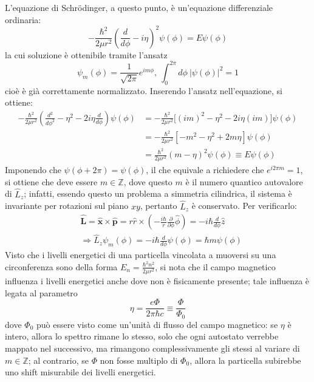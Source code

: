 \documentclass[11pt, a4paper]{scrartcl} %
\numberwithin{equation}{subsection}
\theoremstyle{style2}
\theoremstyle{style1}
\begin{document}
L'equazione di Schr\"odinger, a questo punto, \`e un'equazione differenziale ordinaria:
\begin{equation}
	- \frac{\hbar ^2}{2\mu  r^2} \left(\frac{d }{d \phi } - i \eta\right) ^2 \psi (\phi ) = E \psi (\phi )
\end{equation}
la cui soluzione \`e ottenibile tramite l'ansatz 
\[
\psi _m (\phi ) = \frac{1}{\sqrt{2\pi} }e^{i m \phi } ,\ \int_{0} ^{2\pi} d\phi \ \lvert \psi (\phi ) \rvert ^2 = 1
\] 
cio\`e \`e gi\`a correttamente normalizzato. 
Inserendo l'ansatz nell'equazione, si ottiene:
\[
\begin{split}
	- \frac{\hbar ^2}{2\mu  r^2}\left(\frac{d ^2}{d \phi ^2} - \eta^2 - 2 i \eta  \frac{d }{d \phi } \right)  \psi (\phi ) & = - \frac{\hbar ^2}{2\mu  r^2} \big[(im)^2 - \eta^2 - 2i \eta (im)\big] \psi (\phi )\\
															       & = - \frac{\hbar ^2}{2\mu r^2}[-m^2 - \eta^2 + 2m \eta] \psi (\phi) \\
															       &= \frac{\hbar ^2}{2\mu r^2}(m-\eta)^2 \psi (\phi ) \equiv E \psi (\phi )
\end{split}
\] 
Imponendo che $\psi (\phi  + 2\pi) = \psi (\phi )$, il che equivale a richiedere che $e^{i 2\pi m } = 1 $, si ottiene che deve essere $m \in \mathbb{Z}$, dove questo $m$ \`e il numero quantico autovalore di $\hat{L}_z$; infatti, essendo questo un problema a simmetria cilindrica, il sistema \`e invariante per rotazioni sul piano $xy$, pertanto $\hat{L}_z$ \`e conservato.
Per verificarlo:
\[
	\begin{split}
		&\hat{\mathbf{L} } = \hat{\mathbf{x} } \times \hat{\mathbf{p} } = r \hat{r} \times  \left(- \frac{i\hbar }{r} \frac{\partial }{\partial \phi } \hat{\phi }\right) = - i\hbar \frac{d }{d \phi } \hat{z}\\
		&\Rightarrow \hat{L}_z \psi _m (\phi ) = - i \hbar  \frac{d }{d \phi } \psi (\phi ) = \hbar  m \psi (\phi )
	\end{split}
\] 
Visto che i livelli energetici di una particella vincolata a muoversi su una circonferenza sono della forma $E_n = \frac{\hbar ^2 n ^2}{2 \mu  r^2}$, si nota che il campo magnetico influenza i livelli energetici anche dove non \`e fisicamente presente; tale influenza \`e legata al parametro 
\[
\eta = \frac{e \Phi }{2\pi \hbar  c} \equiv \frac{\Phi}{\Phi_0}
\] 
dove $\Phi_0$ pu\`o essere visto come un'unit\`a di flusso del campo magnetico: se $\eta$ \`e intero, allora lo spettro rimane lo stesso, solo che ogni autostato verrebbe mappato nel successivo, ma rimangono complessivamente gli stessi al variare di $m \in \mathbb{Z}$; al contrario, se $\Phi$ non fosse multiplo di $\Phi_0$, allora la particella subirebbe uno shift misurabile dei livelli energetici.
\end{document}
